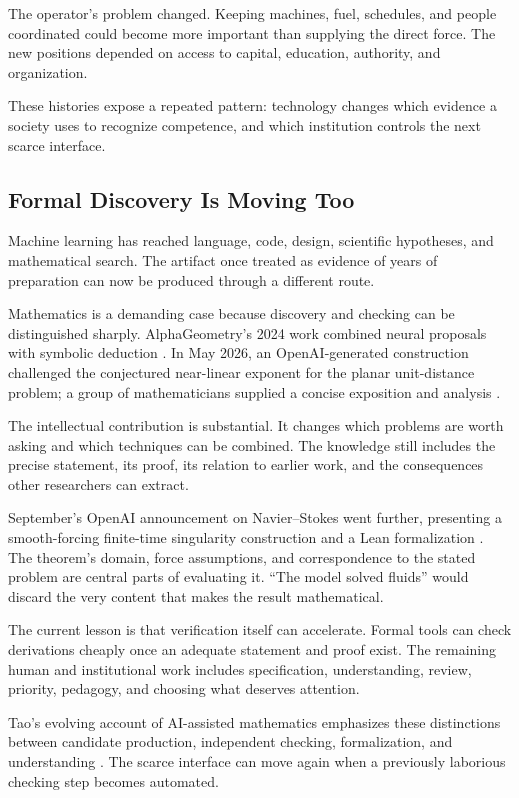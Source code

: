 The operator's problem changed. Keeping machines, fuel, schedules, and people coordinated could become more important than supplying the direct force. The new positions depended on access to capital, education, authority, and organization.

These histories expose a repeated pattern: technology changes which evidence a society uses to recognize competence, and which institution controls the next scarce interface.

\subsection{Formal Discovery Is Moving Too}

Machine learning has reached language, code, design, scientific hypotheses, and mathematical search. The artifact once treated as evidence of years of preparation can now be produced through a different route.

Mathematics is a demanding case because discovery and checking can be distinguished sharply. AlphaGeometry's 2024 work combined neural proposals with symbolic deduction \cite{trinh2024alphageometry}. In May 2026, an OpenAI-generated construction challenged the conjectured near-linear exponent for the planar unit-distance problem; a group of mathematicians supplied a concise exposition and analysis \cite{alon2026remarks}.

The intellectual contribution is substantial. It changes which problems are worth asking and which techniques can be combined. The knowledge still includes the precise statement, its proof, its relation to earlier work, and the consequences other researchers can extract.

September's OpenAI announcement on Navier--Stokes went further, presenting a smooth-forcing finite-time singularity construction and a Lean formalization \cite{openai2026navierstokes}. The theorem's domain, force assumptions, and correspondence to the stated problem are central parts of evaluating it. “The model solved fluids” would discard the very content that makes the result mathematical.

The current lesson is that verification itself can accelerate. Formal tools can check derivations cheaply once an adequate statement and proof exist. The remaining human and institutional work includes specification, understanding, review, priority, pedagogy, and choosing what deserves attention.

Tao's evolving account of AI-assisted mathematics emphasizes these distinctions between candidate production, independent checking, formalization, and understanding \cite{tao2026aiviews}. The scarce interface can move again when a previously laborious checking step becomes automated.

